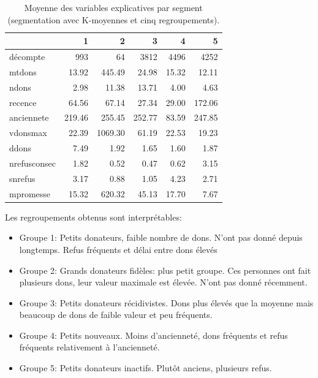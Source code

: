 \documentclass[
  11pt,
  letterpaper,
]{scrbook}
\newenvironment{Shaded}{\begin{snugshade}}{\end{snugshade}}
\newcommand{\AttributeTok}[1]{\textcolor[rgb]{0.40,0.45,0.13}{#1}}
\newcommand{\FunctionTok}[1]{\textcolor[rgb]{0.28,0.35,0.67}{#1}}
\newcommand{\NormalTok}[1]{\textcolor[rgb]{0.00,0.23,0.31}{#1}}
\newcommand{\SpecialCharTok}[1]{\textcolor[rgb]{0.37,0.37,0.37}{#1}}
\providecommand{\tightlist}{%
  \setlength{\itemsep}{0pt}\setlength{\parskip}{0pt}}\usepackage{longtable,booktabs,array}
\theoremstyle{definition}
\theoremstyle{remark}
\begin{document}
\begin{Shaded}
\end{Shaded}

\hypertarget{tbl-kmoy5resume}{}
\begin{table}
\caption{\label{tbl-kmoy5resume}Moyenne des variables explicatives par segment (segmentation avec
K-moyennes et cinq regroupements). }\tabularnewline

\centering
\begin{tabular}{l|r|r|r|r|r}
\hline
  & 1 & 2 & 3 & 4 & 5\\
\hline
décompte & 993 & 64 & 3812 & 4496 & 4252\\
\hline
mtdons & 13.92 & 445.49 & 24.98 & 15.32 & 12.11\\
\hline
ndons & 2.98 & 11.38 & 13.71 & 4.00 & 4.63\\
\hline
recence & 64.56 & 67.14 & 27.34 & 29.00 & 172.06\\
\hline
anciennete & 219.46 & 255.45 & 252.77 & 83.59 & 247.85\\
\hline
vdonsmax & 22.39 & 1069.30 & 61.19 & 22.53 & 19.23\\
\hline
ddons & 7.49 & 1.92 & 1.65 & 1.60 & 1.87\\
\hline
nrefusconsec & 1.82 & 0.52 & 0.47 & 0.62 & 3.15\\
\hline
snrefus & 3.17 & 0.88 & 1.05 & 4.23 & 2.71\\
\hline
mpromesse & 15.32 & 620.32 & 45.13 & 17.70 & 7.67\\
\hline
\end{tabular}
\end{table}

Les regroupements obtenus sont interprétables:

\begin{itemize}
\tightlist
\item
  Groupe 1: Petits donateurs, faible nombre de dons. N'ont pas donné
  depuis longtemps. Refus fréquents et délai entre dons élevés
\item
  Groupe 2: Grands donateurs fidèles: plus petit groupe. Ces personnes
  ont fait plusieurs dons, leur valeur maximale est élevée. N'ont pas
  donné récemment.
\item
  Groupe 3: Petits donateurs récidivistes. Dons plus élevés que la
  moyenne mais beaucoup de dons de faible valeur et peu fréquents.
\item
  Groupe 4: Petits nouveaux. Moins d'ancienneté, dons fréquents et refus
  fréquents relativement à l'ancienneté.
\item
  Groupe 5: Petits donateurs inactifs. Plutôt anciens, plusieurs refus.
\end{itemize}
\end{document}
